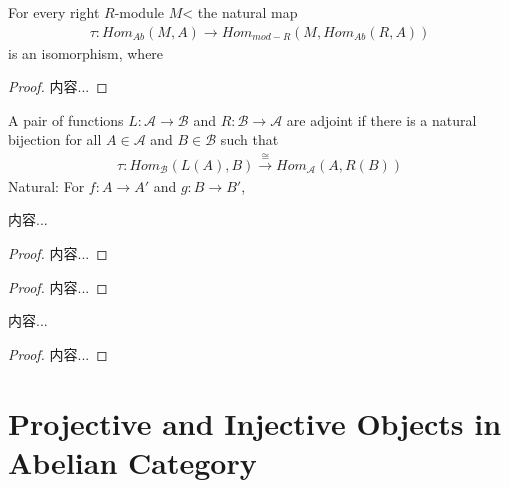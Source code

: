 \documentclass[Total.tex]{subfiles}
\begin{document}
			\begin{lemma}
				For every right $R$-module $M$< the natural map
				\begin{gather*}
					\tau:Hom_{Ab}(M,A)\rightarrow Hom_{mod-R}(M,Hom_{Ab}(R,A))
				\end{gather*}
				is an isomorphism, where
			\end{lemma}
			\begin{proof}
				内容...
			\end{proof}
			\begin{Def}
				A pair of functions $L:\mathcal{A}\rightarrow \mathcal{B}$ and $R:\mathcal{B}\rightarrow \mathcal{A}$ are adjoint if there is a natural bijection for all $A\in \mathcal{A}$ and $B\in \mathcal{B}$ such that
				\begin{gather*}
					\tau:Hom_\mathcal{B}(L(A),B)\stackrel{\cong}{\rightarrow} Hom_\mathcal{A}(A,R(B))
				\end{gather*}
				Natural: For $f:A\rightarrow A'$ and $g:B\rightarrow B'$,
				\begin{center}
				\end{center}	
			\end{Def}
			\begin{corollary}
				内容...
			\end{corollary}
			\begin{proof}
				内容...
			\end{proof}
			
			\begin{proposition}
				
			\end{proposition}
			\begin{proof}
				内容...
			\end{proof}
			
			\begin{corollary}
				内容...
			\end{corollary}
			\begin{proof}
				内容...
			\end{proof}
		\section{Projective and Injective Objects in Abelian Category}
\end{document}
